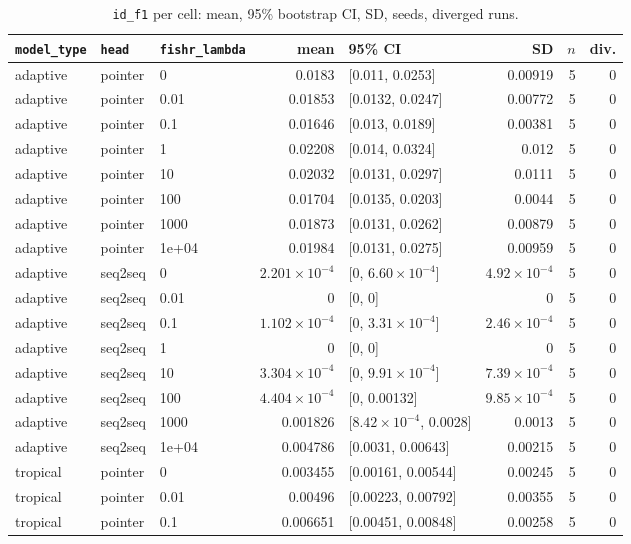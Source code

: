\documentclass[10pt]{article}
\begin{document}
{\small
\begin{longtable}{lllrlrrr}
\caption{\texttt{id\_f1} per cell: mean, 95\% bootstrap CI, SD, seeds, diverged runs.}\label{tab:summary-id_f1}\\
\toprule
\texttt{model\_type} & \texttt{head} & \texttt{fishr\_lambda} & mean & 95\% CI & SD & $n$ & div.\\
\midrule
\endhead
adaptive & pointer & 0 & 0.0183 & [0.011, 0.0253] & 0.00919 & 5 & 0\\
adaptive & pointer & 0.01 & 0.01853 & [0.0132, 0.0247] & 0.00772 & 5 & 0\\
adaptive & pointer & 0.1 & 0.01646 & [0.013, 0.0189] & 0.00381 & 5 & 0\\
adaptive & pointer & 1 & 0.02208 & [0.014, 0.0324] & 0.012 & 5 & 0\\
adaptive & pointer & 10 & 0.02032 & [0.0131, 0.0297] & 0.0111 & 5 & 0\\
adaptive & pointer & 100 & 0.01704 & [0.0135, 0.0203] & 0.0044 & 5 & 0\\
adaptive & pointer & 1000 & 0.01873 & [0.0131, 0.0262] & 0.00879 & 5 & 0\\
adaptive & pointer & 1e+04 & 0.01984 & [0.0131, 0.0275] & 0.00959 & 5 & 0\\
adaptive & seq2seq & 0 & $2.201\times10^{-4}$ & [0, $6.60\times10^{-4}$] & $4.92\times10^{-4}$ & 5 & 0\\
adaptive & seq2seq & 0.01 & 0 & [0, 0] & 0 & 5 & 0\\
adaptive & seq2seq & 0.1 & $1.102\times10^{-4}$ & [0, $3.31\times10^{-4}$] & $2.46\times10^{-4}$ & 5 & 0\\
adaptive & seq2seq & 1 & 0 & [0, 0] & 0 & 5 & 0\\
adaptive & seq2seq & 10 & $3.304\times10^{-4}$ & [0, $9.91\times10^{-4}$] & $7.39\times10^{-4}$ & 5 & 0\\
adaptive & seq2seq & 100 & $4.404\times10^{-4}$ & [0, 0.00132] & $9.85\times10^{-4}$ & 5 & 0\\
adaptive & seq2seq & 1000 & 0.001826 & [$8.42\times10^{-4}$, 0.0028] & 0.0013 & 5 & 0\\
adaptive & seq2seq & 1e+04 & 0.004786 & [0.0031, 0.00643] & 0.00215 & 5 & 0\\
tropical & pointer & 0 & 0.003455 & [0.00161, 0.00544] & 0.00245 & 5 & 0\\
tropical & pointer & 0.01 & 0.00496 & [0.00223, 0.00792] & 0.00355 & 5 & 0\\
tropical & pointer & 0.1 & 0.006651 & [0.00451, 0.00848] & 0.00258 & 5 & 0\\

\end{longtable}}
\end{document}
